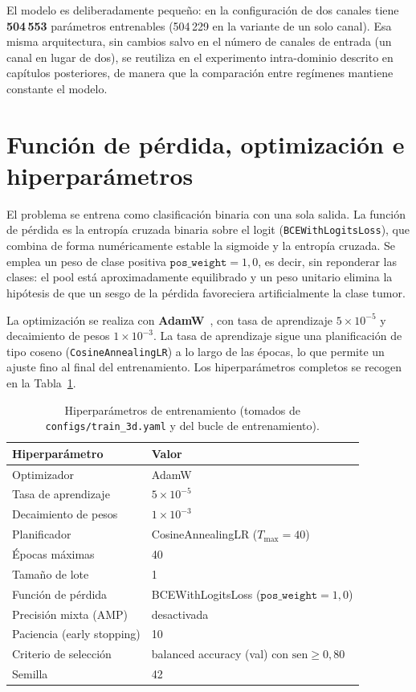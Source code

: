El modelo es deliberadamente pequeño: en la configuración de dos canales tiene
\textbf{504\,553} parámetros entrenables (504\,229 en la variante de un solo
canal). Esa misma arquitectura, sin cambios salvo en el número de canales de
entrada (un canal en lugar de dos), se reutiliza en el experimento intra-dominio
descrito en capítulos posteriores, de manera que la comparación entre regímenes
mantiene constante el modelo.

\section{Función de pérdida, optimización e hiperparámetros}

El problema se entrena como clasificación binaria con una sola salida. La función
de pérdida es la entropía cruzada binaria sobre el logit
(\texttt{BCEWithLogitsLoss}), que combina de forma numéricamente estable la
sigmoide y la entropía cruzada. Se emplea un peso de clase positiva
$\texttt{pos\_weight}=1{,}0$, es decir, sin reponderar las clases: el pool está
aproximadamente equilibrado y un peso unitario elimina la hipótesis de que un
sesgo de la pérdida favoreciera artificialmente la clase tumor.

La optimización se realiza con \textbf{AdamW}~\cite{loshchilov2019adamw}, con tasa
de aprendizaje $5\times10^{-5}$ y decaimiento de pesos $1\times10^{-3}$. La tasa
de aprendizaje sigue una planificación de tipo coseno
(\texttt{CosineAnnealingLR}) a lo largo de las épocas, lo que permite un ajuste
fino al final del entrenamiento. Los hiperparámetros completos se recogen en la
Tabla~\ref{tab:hiperparametros}.

\begin{table}[ht]
  \centering
  \caption[Hiperparámetros de entrenamiento]{Hiperparámetros de entrenamiento (tomados de \texttt{configs/train\_3d.yaml}
  y del bucle de entrenamiento).}
  \label{tab:hiperparametros}
  \begin{tabular}{l l}
    \hline
    \textbf{Hiperparámetro} & \textbf{Valor} \\
    \hline
    Optimizador                  & AdamW \\
    Tasa de aprendizaje          & $5\times10^{-5}$ \\
    Decaimiento de pesos         & $1\times10^{-3}$ \\
    Planificador                 & CosineAnnealingLR ($T_{\max}=40$) \\
    Épocas máximas               & 40 \\
    Tamaño de lote               & 1 \\
    Función de pérdida           & BCEWithLogitsLoss ($\texttt{pos\_weight}=1{,}0$) \\
    Precisión mixta (AMP)        & desactivada \\
    Paciencia (early stopping)   & 10 \\
    Criterio de selección        & balanced accuracy (val) con $\text{sen}\geq0{,}80$ \\
    Semilla                      & 42 \\
    \hline
  \end{tabular}
\end{table}

